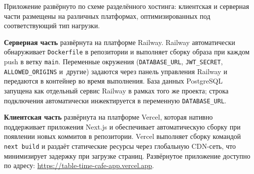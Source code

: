 Приложение развёрнуто по схеме разделённого хостинга: клиентская и
серверная части размещены на различных платформах, оптимизированных
под соответствующий тип нагрузки.

\textbf{Серверная часть} развёрнута на платформе Railway. Railway
автоматически обнаруживает \texttt{Dockerfile} в репозитории и
выполняет сборку образа при каждом push в ветку \texttt{main}.
Переменные окружения (\texttt{DATABASE\_URL}, \texttt{JWT\_SECRET},
\texttt{ALLOWED\_ORIGINS} и~другие) задаются через панель управления
Railway и передаются в контейнер во время выполнения. База данных
PostgreSQL запущена как отдельный сервис Railway в рамках того же
проекта; строка подключения автоматически инжектируется
в переменную \texttt{DATABASE\_URL}.

\textbf{Клиентская часть} развёрнута на платформе Vercel, которая
нативно поддерживает приложения Next.js и обеспечивает
автоматическую сборку при появлении новых коммитов в репозитории.
Vercel выполняет сборку командой \texttt{next build} и раздаёт
статические ресурсы через глобальную CDN-сеть, что минимизирует
задержку при загрузке страниц. Развёрнутое приложение доступно по
адресу: \url{https://table-time-cafe-app.vercel.app}.

